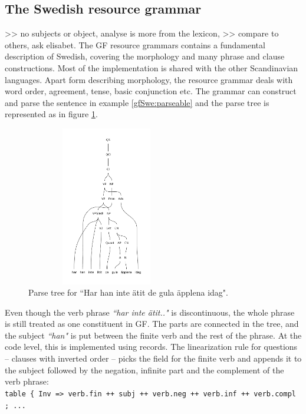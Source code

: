 \documentclass{report}
\begin{document}
\subsection{The Swedish resource grammar}
>> no subjects or object, analyse is more from the lexicon,
>> compare to others, ask elisabet.
\label{sec:swegf}
The GF resource grammars contains a fundamental description of Swedish,
covering the morphology and many phrase and clause constructions. Most of the implementation
is shared with the other Scandinavian languages.
Apart form describing morphology, the resource grammar deals with
word order, agreement, tense, basic conjunction etc.
\label{gfSwe:parseable}
The grammar can construct and parse the sentence in example \ref{gfSwe:parseable}
and the parse tree is represented as in figure \ref{gfSwe:parsetree}.
\begin{figure}[h]
\includegraphics[width=70mm,height=70mm]{apples.pdf}
\caption{Parse tree for ``Har han inte ätit de gula äpplena idag".}
\label{gfSwe:parsetree}
\end{figure}
Even though the verb phrase \emph{``har inte ätit.."} is discontinuous, the whole
phrase is still treated as one constituent in GF. The parts
are connected in the tree, and the subject \emph{``han"} is put between the
finite verb and the rest of the phrase. At the code level, this is implemented
using records.
The linearization rule for questions -- clauses with inverted order -- picks 
the field for the finite verb and appends it to the subject followed by
the negation, infinite part and the complement of the verb phrase: \\
\verb|table { Inv => verb.fin ++ subj ++ verb.neg ++ verb.inf ++ verb.compl ; ... | \\
\end{document}
